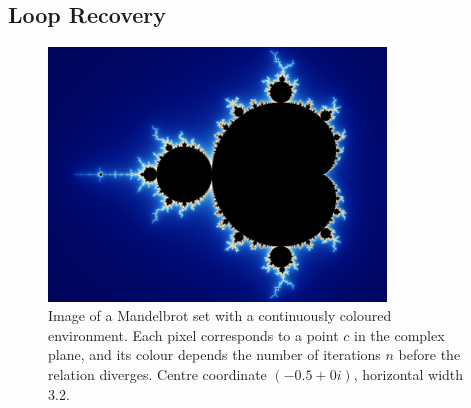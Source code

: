 \subsection{Loop Recovery}


% 

%
\begin{figure}[htbp]
    \begin{center}
        \includegraphics[width=0.8\textwidth]{images/sec-5/mandelbrot}
    \end{center}
    \caption[The Mandelbrot fractal]{Image of a Mandelbrot set with a
        continuously coloured environment. Each pixel corresponds to a point $c$
        in the complex plane, and its colour depends the number of iterations
        $n$ before the relation diverges. Centre coordinate
        $\left( -0.5+0i \right)$, horizontal width 3.2.}
    \label{fig:mandelbrot}
\end{figure}

